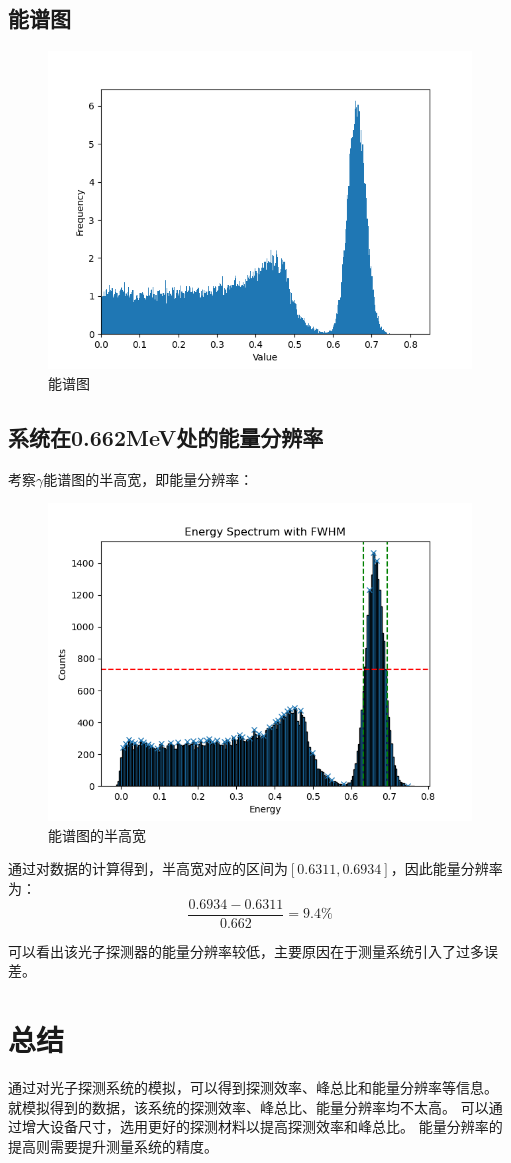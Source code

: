 \documentclass[UTF8, a4paper]{ctexart}
\begin{document}
\subsection{能谱图}
\begin{figure}[h]
    \centering
    \includegraphics[width=1\textwidth]{../fig/E_D_distribution.png}
    \caption{能谱图}
    \label{fig:energy_distribution}
\end{figure}
\clearpage

\subsection{系统在0.662MeV处的能量分辨率}
考察$\gamma$能谱图的半高宽，即能量分辨率：
\begin{figure}[h]
    \centering
    \includegraphics[width=1\textwidth]{../fig/E_D_spectrum_with_FWHM.png}
    \caption{能谱图的半高宽}
    \label{fig:energy_fhwm}
\end{figure}

通过对数据的计算得到，半高宽对应的区间为$[0.6311, 0.6934]$，因此能量分辨率为：
\[
    \frac{0.6934-0.6311}{0.662}=9.4\%
\]

可以看出该光子探测器的能量分辨率较低，主要原因在于测量系统引入了过多误差。

\section{总结}
通过对光子探测系统的模拟，可以得到探测效率、峰总比和能量分辨率等信息。
就模拟得到的数据，该系统的探测效率、峰总比、能量分辨率均不太高。
可以通过增大设备尺寸，选用更好的探测材料以提高探测效率和峰总比。
能量分辨率的提高则需要提升测量系统的精度。
\end{document}
